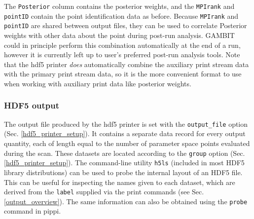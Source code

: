 \documentclass[pdftex,twocolumn,epjc3_preprint,runningheads]{svjour3}
\renewcommand{\_}{\discretionary{\underscore}{}{\underscore}}
\newcommand\cpp[1]{{\lstinline!#1!}}  %
\newcommand\yaml[1]{{\lstset{style=yaml}\lstinline!#1!\lstset{style=cpp}}}
\newcommand\term[1]{{\lstset{style=terminal}\lstinline!#1!\lstset{style=cpp}}}
\newcommand{\gambit}{\textsf{GAMBIT}\xspace}
\newcommand{\GB}{\gambit}
\newcommand\pippi{\textsf{pippi}\xspace}
\begin{document}
The \term{Posterior} column contains the posterior weights, and the \term{MPIrank} and \term{pointID} contain the point identification data as before. Because \term{MPIrank} and \term{pointID} are shared between output files, they can be used to correlate Posterior weights with other data about the point during post-run analysis. \GB could in principle perform this combination automatically at the end of a run, however it is currently left up to user's preferred post-run analysis tools. Note that the \textsf{hdf5} printer \emph{does} automatically combine the auxiliary print stream data with the primary print stream data, so it is the more convenient format to use when working with auxiliary print data like posterior weights.

\subsubsection{\textsf{HDF5} output}
\label{hdf5_output}
The output file produced by the \textsf{hdf5} printer is set with the \yaml{output_file} option (Sec. \ref{hdf5_printer_setup}).  It contains a separate data record for every output quantity, each of length equal to the number of parameter space points evaluated during the scan. These datasets are located according to the \yaml{group} option (Sec. \ref{hdf5_printer_setup}). The command-line utility \term{h5ls} (included in most \textsf{HDF5} library distributions) can be used to probe the internal layout of an \textsf{HDF5} file. This can be useful for inspecting the names given to each dataset, which are derived from the \cpp{label} supplied via the print commands (see Sec. \ref{output_overview}).  The same information can also be obtained using the \term{probe} command in \pippi \cite{pippi}.
\end{document}
